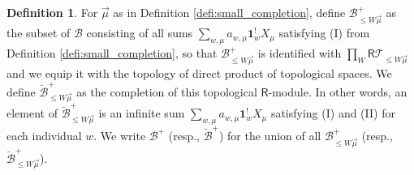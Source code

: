 \documentclass{amsart}
\newcommand{\Ring}{\mathsf{R}}
\newcommand{\bone}{\mathbf{1}}
\newcommand{\B}{\mathcal{B}}
\theoremstyle{definition}
\newtheorem{defi}[Thm]{Definition}
\numberwithin{equation}{section}
\begin{document}
\begin{defi}\label{defi:completed_bimodule}
For $\vec{\mu}$ as in Definition \ref{defi:small_completion},
define $\B^+_{\leqslant W\vec{\mu}}$ as the subset of $\B$ consisting of all sums $\sum_{w,\mu}a_{w,\mu}\bone^!_w X_\mu$ satisfying (I) from Definition \ref{defi:small_completion}, so that $\B^+_{\leqslant W\vec{\mu}}$ is identified with $\prod_{W} \Ring \mathcal{T}_{\leqslant W\vec{\mu}}$ and we equip it with the topology of direct product of topological spaces. We define  $\breve{\B}^+_{\leqslant W\vec{\mu}}$ as the completion of this topological $\Ring$-module. In other words, an element of $\breve{\B}^+_{\leqslant W\vec{\mu}}$ is an infinite sum $\sum_{w,\mu} a_{w,\mu}\bone^!_w X_\mu$ satisfying (I) and (II) for each individual $w$. We write $\B^+$ (resp., $\breve{\B}^+$) for the union of all $\B^+_{\leqslant W\vec{\mu}}$ (resp., $\breve{\B}^+_{\leqslant W\vec{\mu}}$).


\end{defi}
\end{document}
